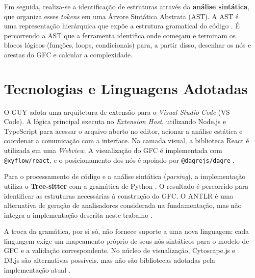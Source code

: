 Em seguida, realiza-se a identificação de estruturas através da \textbf{análise sintática}, que organiza esses \textit{tokens} em uma Árvore Sintática Abstrata (AST). A AST é uma representação hierárquica que expõe a estrutura gramatical do código . É percorrendo a AST que a ferramenta identifica onde começam e terminam os blocos lógicos (funções, loops, condicionais) para, a partir disso, desenhar os nós e arestas do GFC e calcular a complexidade.

\section{Tecnologias e Linguagens Adotadas}

O GUY adota uma arquitetura de extensão para o \textit{Visual Studio Code} (VS Code). A lógica principal executa no \textit{Extension Host}, utilizando Node.js e TypeScript para acessar o arquivo aberto no editor, acionar a análise estática e coordenar a comunicação com a interface. Na camada visual, a biblioteca React é utilizada em uma \textit{Webview}. A visualização do GFC é implementada com \texttt{@xyflow/react}, e o posicionamento dos nós é apoiado por \texttt{@dagrejs/dagre} .

Para o processamento de código e a análise sintática (\textit{parsing}), a implementação utiliza o \textbf{Tree-sitter} com a gramática de Python . O resultado é percorrido para identificar as estruturas necessárias à construção do GFC. O ANTLR é uma alternativa de geração de analisadores considerada na fundamentação, mas não integra a implementação descrita neste trabalho \cite{ANTLRWeb}.

A troca da gramática, por si só, não fornece suporte a uma nova linguagem: cada linguagem exige um mapeamento próprio de seus nós sintáticos para o modelo de GFC e a validação correspondente. No núcleo de visualização, Cytoscape.js e D3.js são alternativas possíveis, mas não são bibliotecas adotadas pela implementação atual .



